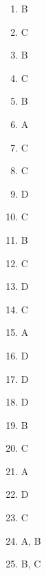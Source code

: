\begin{enumerate}
\item B
\item C
\item B
\item C
\item B
\item A
\item C
\item C
\item D
\item C
\item B
\item C
\item D
\item C
\item A
\item D
\item D
\item D
\item B
\item C
\item A
\item D
\item C
\item A, B
\item B, C
\end{enumerate}

